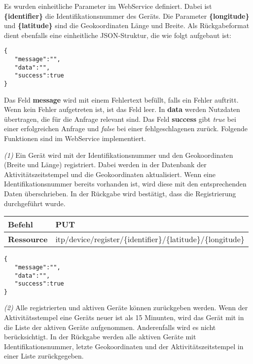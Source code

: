 Es wurden einheitliche Parameter im WebService definiert. Dabei ist \textbf{\{identifier\}} die Identifikationsnummer des Geräts. Die Parameter \textbf{\{longitude\}} und \textbf{\{latitude\}} sind die Geokoordinaten Länge und Breite. Als Rückgabeformat dient ebenfalls eine einheitliche JSON-Struktur, die wie folgt aufgebaut ist:

\begin{lstlisting}[caption={Einheitliche Rückgabe JSON-Struktur}]
{
   "message":"",
   "data":"",
   "success":true
}
\end{lstlisting} 


Das Feld \textbf{message} wird mit einem Fehlertext befüllt, falls ein Fehler auftritt. Wenn kein Fehler aufgetreten ist, ist das Feld leer. In \textbf{data} werden Nutzdaten übertragen, die für die Anfrage relevant sind. Das Feld \textbf{success} gibt \textit{true} bei einer erfolgreichen Anfrage und \textit{false} bei einer fehlgeschlagenen zurück. Folgende Funktionen sind im WebService implementiert.

\textit{(1)} Ein Gerät wird mit der Identifikationsnummer und den Geokoordinaten (Breite und Länge) registriert. Dabei werden in der Datenbank der Aktivitätszeitstempel und die Geokoordinaten aktualisiert. Wenn eine Identifikationsnummer bereits vorhanden ist, wird diese mit den entsprechenden Daten überschrieben. In der Rückgabe wird bestätigt, dass die Registrierung durchgeführt wurde.

\begin{table}[!htb] 
    \begin{tabular}{l|l}
    \textbf{Befehl}    & PUT                                          \\ \hline
    \textbf{Ressource} & itp/device/register/\{identifier\}/\{latitude\}/\{longitude\} \\ 
    \end{tabular}
\end{table}

\begin{lstlisting}[caption={Rückgabe}]
{
   "message":"",
   "data":"",
   "success":true
}
\end{lstlisting} 


\textit{(2)} Alle registrierten und aktiven Geräte können zurückgeben werden. Wenn der Aktivitätsstempel eine Geräts neuer ist als 15 Minunten, wird das Gerät mit in die Liste der aktiven Geräte aufgenommen. Anderenfalls wird es nicht berücksichtigt. In der Rückgabe werden alle aktiven Geräte mit Identifikationsnummer, letzte Geokoordinaten und der Aktivitätszeitstempel in einer Liste zurückgegeben.

